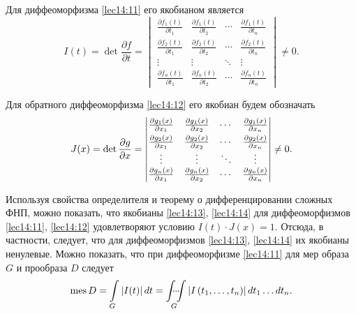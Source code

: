 \documentclass[../../main.tex]{subfiles}
\begin{document}
	Для диффеоморфизма \eqref{lec14:11} его якобианом является 
	\begin{equation}
	\label{lec14:13}
	I(t) = \det \frac{\partial f}{\partial t}=
	\begin{vmatrix}
	\frac{\partial f_1\left(t\right)}{\partial t_1} & \frac{\partial 
	f_1\left(t\right)}{\partial t_2}
	& \cdots & \frac{\partial f_1\left(t\right)}{\partial t_n} \\
	\frac{\partial f_2\left(t\right)}{\partial t_1} & \frac{\partial 
	f_2\left(t\right)}{\partial t_2} 
	& \cdots & \frac{\partial f_2\left(t\right)}{\partial t_n} \\
	\vdots  & \vdots  & \ddots & \vdots  \\
	\frac{\partial f_n\left(t\right)}{\partial t_1} & \frac{\partial 
	f_n\left(t\right)}{\partial t_2}
	& \cdots & \frac{\partial f_n\left(t\right)}{\partial t_n}
	\end{vmatrix} \ne 0.
	\end{equation}
	
	Для обратного диффеоморфизма \eqref{lec14:12} его якобиан будем обозначать
	\begin{equation}
	\label{lec14:14}
	J(x) = \det \frac{\partial g}{\partial x}=
	\begin{vmatrix}
	\smallskip
	\frac{\partial g_1\left(x \right)}{\partial x_1} & \frac{\partial g_1\left(x 
	\right)}{\partial x_2}
	& \cdots & \frac{\partial g_1\left(x \right)}{\partial x_n} \\
	\frac{\partial g_2\left(x \right)}{\partial x_1} & \frac{\partial g_2\left(x 
	\right)}{\partial x_2} 
	& \cdots & \frac{\partial g_2\left(x \right)}{\partial x_n} \\
	\vdots  & \vdots  & \ddots & \vdots  \\
	\frac{\partial g_n\left(x \right)}{\partial x_1} & \frac{\partial g_n\left(x 
	\right)}{\partial x_2}
	& \cdots & \frac{\partial g_n\left(x \right)}{\partial x_n}
	\end{vmatrix} \ne 0.
	\end{equation}
	
	Используя свойства определителя и теорему о дифференцировании сложных ФНП, 
	можно
	показать, что якобианы \eqref{lec14:13}, \eqref{lec14:14} для диффеоморфизмов 
	\eqref{lec14:11}, \eqref{lec14:12}
	удовлетворяют условию $I(t)\cdot J(x) = 1$.
	Отсюда, в частности, следует, что для диффеоморфизмов \eqref{lec14:13}, 
	\eqref{lec14:14} 
	их якобианы ненулевые. Можно показать, что 
	при диффеоморфизме \eqref{lec14:11} для мер образа $G$ и прообраза $D$ следует
	\begin{equation}
	\label{lec14:15}
	\operatorname{mes} D = \int\limits_G \left| 
	I(t) \right|dt = \idotsint\limits_G \left| 
	I\left( t_1, \ldots, t_n\right) \right| dt_1\ldots dt_n.
	\end{equation} 
	
\end{document}
